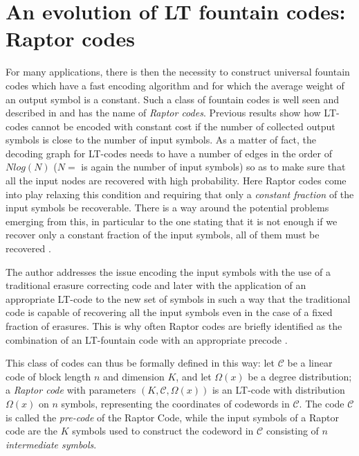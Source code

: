 \section{An evolution of LT fountain codes: Raptor codes}
\label{sec:raptor}
For many applications, there is then the necessity to construct universal fountain codes which have a fast encoding algorithm and for which the average weight of an output symbol is a constant. Such a class of fountain codes is well seen and described in \cite{Shokrollahi2006} and has the name of \textit{Raptor codes}. Previous results show how LT-codes cannot be encoded with constant cost if the number of collected output symbols is close to the number of input symbols. As a matter of fact, the decoding graph for LT-codes needs to have a number of edges in the order of $Nlog(N)$ ($N =$ is again the number of input symbols) so as to make sure that all the input nodes are recovered with high probability. Here Raptor codes come into play relaxing this condition and requiring that only a \textit{constant fraction} of the input symbols be recoverable. There is a way around the potential problems emerging from this, in particular to the one stating that it is not enough if we recover only a constant fraction of the input symbols, all of them must be recovered \cite{Luby}.

The author addresses the issue encoding the input symbols with the use of a traditional erasure correcting code and later with the application of an appropriate LT-code to the new set of symbols in such a way that the traditional code is capable of recovering all the input symbols even in the case of a fixed fraction of erasures. This is why often Raptor codes are briefly identified as the combination of an LT-fountain code with an appropriate precode \cite{Etesami2006}.

This class of codes can thus be formally defined in this way: let $\mathcal{C}$ be a linear code of block length $n$ and dimension $K$, and let $\Omega(x)$ be a degree distribution; a \textit{Raptor code} with parameters $(K,\mathcal{C},\Omega(x))$ is an LT-code with distribution $\Omega(x)$ on $n$ symbols, representing the coordinates of codewords in $\mathcal{C}$. The code $\mathcal{C}$ is called the \textit{pre-code} of the Raptor Code, while the input symbols of a Raptor code are the $K$ symbols used to construct the codeword in $\mathcal{C}$ consisting of $n$ \textit{intermediate symbols}.
